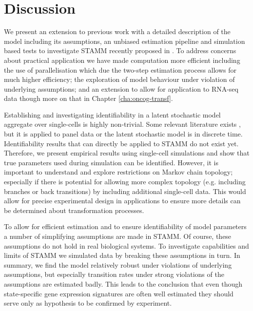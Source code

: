 \section{Discussion}
\label{sec:discussion}

We present an extension to previous work with a detailed description of the model including its assumptions, an unbiased estimation pipeline and simulation based tests to investigate STAMM recently proposed in \cite{Armond:2013}. To address concerns about practical application we have made computation more efficient including the use of parallelisation which due the two-step estimation process allows for much higher efficiency; the exploration of model behaviour under violation of underlying assumptions; and an extension to allow for application to RNA-seq data though more on that in Chapter \ref{cha:oncog-transf}.



Establishing and investigating identifiability in a latent stochastic model aggregate over single-cells is highly non-trivial. Some relevant literature exists \citep{Kalbfleisch:1983vd, Kalbfleisch:1984wz, Kalbfleisch:1985tw}, but it is applied to panel data or the latent stochastic model is in discrete time. Identifiability results that can directly be applied to STAMM do not exist yet.  Therefore, we present empirical results using single-cell simulations and show that true parameters used during simulation can be identified. However, it is important to understand and explore restrictions on Markov chain topology; especially if there is potential for allowing more complex topology (e.g. including branches or back transitions) by including additional single-cell data. This would allow for precise experimental design in applications to ensure more details can be determined about transformation processes.

To allow for efficient estimation and to ensure identifiability of model parameters a number of simplifying assumptions are made in STAMM. Of course, these assumptions do not hold in real biological systems. To investigate capabilities and limits of STAMM we simulated data by breaking these assumptions in turn. In summary, we find the model relatively robust under violations of underlying assumptions, but especially transition rates under strong violations of the assumptions are estimated badly. This leads to the conclusion that even though state-specific gene expression signatures are often well estimated they should serve only as hypothesis to be confirmed by experiment.

